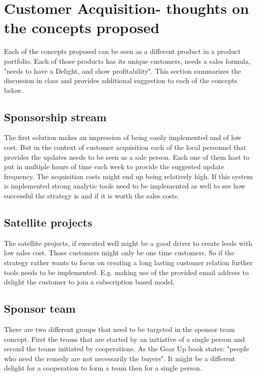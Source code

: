 \section{Customer Acquisition- thoughts on the concepts proposed}

Each of the concepts proposed can be seen as a different product in a product portfolio. Each of those products has its unique customers, needs a sales formula, "needs to have a Delight, and show profitability"\cite{Ramfelt}. This section summarizes the discussion in class and provides additional suggestion to each of the concepts below.

\subsection{Sponsorship stream}

The first solution makes an impression of being easily implemented and of low cost. But in the context of customer acquisition each of the local personnel that provides the updates needs to be seen as a sale person. Each one of them hast to put in multiple hours of time each week to provide the suggested update frequency. The acquisition costs might end up being relatively high. If this system is implemented strong analytic tools need to be implemented as well to see how successful the strategy is and if it is worth the sales costs.


\subsection{Satellite projects}

The satellite projects, if executed well might be a good driver to create leeds with low sales cost. Those customers might only be one time customers. So if the strategy rather wants to focus on creating a long lasting customer relation further tools needs to be implemented. E.g. making use of the provided email address to delight the customer to join a subscription based model.

\subsection{Sponsor team}
There are two different groups that need to be targeted in the sponsor team concept. First the teams that are started by an initiative of a single person and second the teams initiated by cooperations. As the Gear Up book states: "people who need the remedy are not necessarily the buyers"\cite{Ramfelt}. It might be a different delight for a cooperation to form a team then for a single person.

